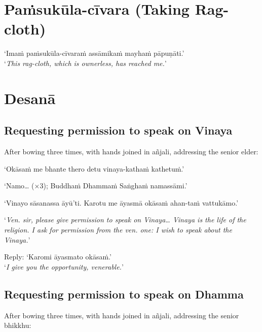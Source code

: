 \section{Paṁsukūla-cīvara (Taking Rag-cloth)}

‘Imaṁ paṁsukūla-cīvaraṁ assāmikaṁ mayhaṁ pāpuṇāti.’\\
‘\emph{This rag-cloth, which is ownerless, has reached me.}’

\ifhandbookedition
\clearpage
\fi

\section{Desanā}

\subsection[Permission to speak on Vinaya]{Requesting permission to speak on Vinaya}

\vspace*{-0.5\baselineskip}

\begin{instruction}
  After bowing three times, with hands joined in añjali, addressing the senior
  elder:
\end{instruction}

‘Okāsaṁ me bhante thero detu vinaya-kathaṁ kathetuṁ.’

‘Namo… (×3); Buddhaṁ Dhammaṁ Saṅghaṁ namassāmi.’

‘Vinayo sāsanassa āyū'ti. Karotu me āyasmā okāsaṁ ahan-taṁ vattukāmo.’

‘\emph{Ven. sir, please give permission to speak on Vinaya… Vinaya is the life
  of the religion. I ask for permission from the ven. one: I wish to speak about
  the Vinaya.}’

Reply: ‘Karomi āyasmato okāsaṁ.’\\
‘\emph{I give you the opportunity, venerable.}’ 

\subsection[Permission to speak on Dhamma]{Requesting permission to speak on Dhamma}

\vspace*{-0.5\baselineskip}

\begin{instruction}
  After bowing three times, with hands joined in añjali, addressing the senior
  bhikkhu:
\end{instruction}

